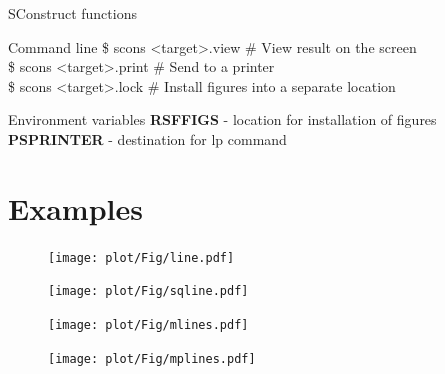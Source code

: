 \begin{frame}
  \begin{block}{SConstruct functions}
   
  \end{block}
  \begin{block}{Command line}
   \$ scons \textless target\textgreater.view \# View result on the screen \\
   \$ scons \textless target\textgreater.print \# Send to a printer \\
   \$ scons \textless target\textgreater.lock \# Install figures into a separate location
  \end{block}
  \begin{block}{Environment variables}
   {\bf RSFFIGS} - location for installation of figures \\
   {\bf PSPRINTER} - destination for lp command
  \end{block}
\end{frame}

\section{Examples}

\begin{frame}
  \begin{figure}
  \texttt{[image: plot/Fig/line.pdf]}
  \end{figure}
\end{frame}

\begin{frame}
  \begin{figure}
  \texttt{[image: plot/Fig/sqline.pdf]}
  \end{figure}
\end{frame}

\begin{frame}
  \begin{figure}
  \texttt{[image: plot/Fig/mlines.pdf]}
  \end{figure}
\end{frame}

\begin{frame}
  \begin{figure}
  \texttt{[image: plot/Fig/mplines.pdf]}
  \end{figure}
\end{frame}

